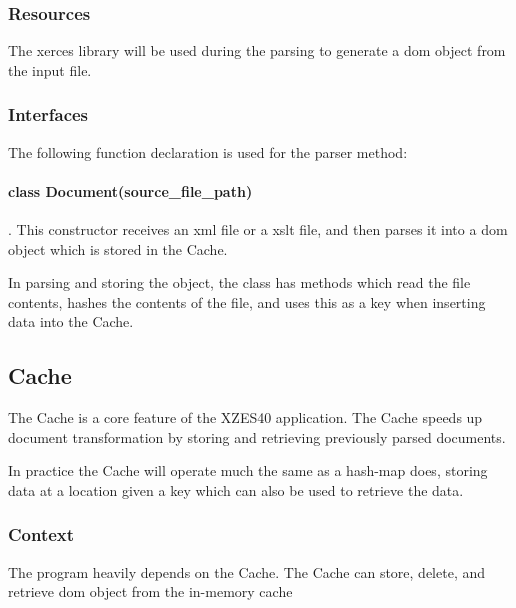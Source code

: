 \subsubsection{Resources}

The \gls{xerces} library will be used during the parsing to generate a \gls{dom} object from the input file.

\subsubsection{Interfaces}

The following function declaration is used for the parser method:

\paragraph{class Document(source\_file\_path)}. This constructor receives an \gls{xml} file or a \gls{xslt} file, and then parses it into a \gls{dom} object which is stored in the Cache.

In parsing and storing the object, the class has methods which read the file contents, hashes the contents of the file, and uses this as a key when inserting data into the Cache.

\subsection{Cache}
\label{cache}

The Cache is a core feature of the XZES40 application.
The Cache speeds up document transformation by storing and retrieving previously parsed documents.

In practice the Cache will operate much the same as a \gls{hash-map} does, storing data at a location given a key which can also be used to retrieve the data.

\subsubsection{Context}

The program heavily depends on the Cache.
The Cache can store, delete, and retrieve \gls{dom} object from the in-memory cache 

